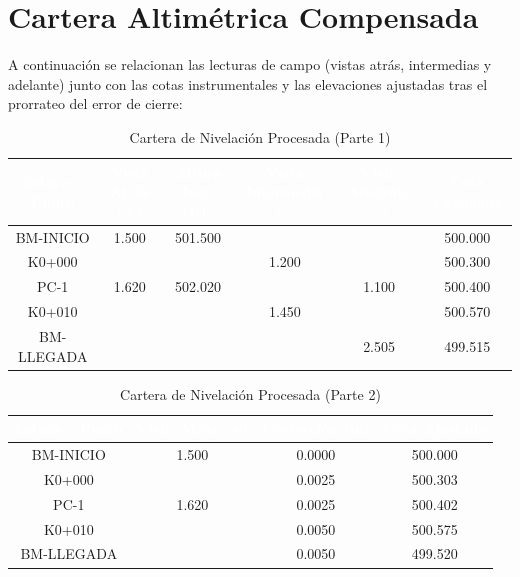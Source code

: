 \documentclass[11pt,letterpaper]{article}
\begin{document}
\section{Cartera Altimétrica Compensada}
A continuación se relacionan las lecturas de campo (vistas atrás, intermedias y adelante) junto con las cotas instrumentales y las elevaciones ajustadas tras el prorrateo del error de cierre:
\begin{table}[H]
  \centering
  \small
  \caption{Cartera de Nivelación Procesada (Parte 1)}
  \label{tab:nivelacion_0}
  \begin{tabular}{|c|c|c|c|c|c|}
    \hline
    \rowcolor{GeoBlue}
    \textcolor{white}{\textbf{Estaca / Punto}} & \textcolor{white}{\textbf{Vista Atrás (+)}} & \textcolor{white}{\textbf{Altura Inst. (HI)}} & \textcolor{white}{\textbf{Vista Intermedia (-)}} & \textcolor{white}{\textbf{Vista Adelante (-)}} & \textcolor{white}{\textbf{Cota Calculada}} \\
    \hline
    \rowcolor{GeoBlue!5}
    BM-INICIO & 1.500 & 501.500 &  &  & 500.000 \\
    \hline
    \rowcolor{white}
    K0+000 &  &  & 1.200 &  & 500.300 \\
    \hline
    \rowcolor{GeoBlue!5}
    PC-1 & 1.620 & 502.020 &  & 1.100 & 500.400 \\
    \hline
    \rowcolor{white}
    K0+010 &  &  & 1.450 &  & 500.570 \\
    \hline
    \rowcolor{GeoBlue!5}
    BM-LLEGADA &  &  &  & 2.505 & 499.515 \\
    \hline
  \end{tabular}
\end{table}
\vspace{0.8cm}
\begin{table}[H]
  \centering
  \small
  \caption{Cartera de Nivelación Procesada (Parte 2)}
  \label{tab:nivelacion_1}
  \begin{tabular}{|c|c|c|c|}
    \hline
    \rowcolor{GeoBlue}
    \textcolor{white}{\textbf{Estaca / Punto}} & \textcolor{white}{\textbf{Vista Atrás (+)}} & \textcolor{white}{\textbf{Corrección (m)}} & \textcolor{white}{\textbf{Cota Ajustada}} \\
    \hline
    \rowcolor{GeoBlue!5}
    BM-INICIO & 1.500 & 0.0000 & 500.000 \\
    \hline
    \rowcolor{white}
    K0+000 &  & 0.0025 & 500.303 \\
    \hline
    \rowcolor{GeoBlue!5}
    PC-1 & 1.620 & 0.0025 & 500.402 \\
    \hline
    \rowcolor{white}
    K0+010 &  & 0.0050 & 500.575 \\
    \hline
    \rowcolor{GeoBlue!5}
    BM-LLEGADA &  & 0.0050 & 499.520 \\
    \hline
  \end{tabular}
\end{table}
\vspace{0.8cm}
\end{document}
